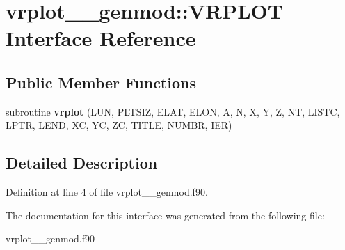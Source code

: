 \hypertarget{interfacevrplot____genmod_1_1_v_r_p_l_o_t}{\section{vrplot\+\_\+\+\_\+genmod\+:\+:V\+R\+P\+L\+O\+T Interface Reference}
\label{interfacevrplot____genmod_1_1_v_r_p_l_o_t}
}
\subsection*{Public Member Functions}
\begin{DoxyCompactItemize}
\item 
\hypertarget{interfacevrplot____genmod_1_1_v_r_p_l_o_t_a05cde86bdce75204c9db99e6c628ed9d}{subroutine {\bfseries vrplot} (L\+U\+N, P\+L\+T\+S\+I\+Z, E\+L\+A\+T, E\+L\+O\+N, A, N, X, Y, Z, N\+T, L\+I\+S\+T\+C, L\+P\+T\+R, L\+E\+N\+D, X\+C, Y\+C, Z\+C, T\+I\+T\+L\+E, N\+U\+M\+B\+R, I\+E\+R)}\label{interfacevrplot____genmod_1_1_v_r_p_l_o_t_a05cde86bdce75204c9db99e6c628ed9d}

\end{DoxyCompactItemize}


\subsection{Detailed Description}


Definition at line 4 of file vrplot\+\_\+\+\_\+genmod.\+f90.



The documentation for this interface was generated from the following file\+:\begin{DoxyCompactItemize}
\item 
vrplot\+\_\+\+\_\+genmod.\+f90\end{DoxyCompactItemize}
